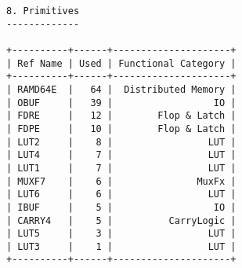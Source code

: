 \begin{verbatim}
8. Primitives
-------------

+----------+------+---------------------+
| Ref Name | Used | Functional Category |
+----------+------+---------------------+
| RAMD64E  |   64 |  Distributed Memory |
| OBUF     |   39 |                  IO |
| FDRE     |   12 |        Flop & Latch |
| FDPE     |   10 |        Flop & Latch |
| LUT2     |    8 |                 LUT |
| LUT4     |    7 |                 LUT |
| LUT1     |    7 |                 LUT |
| MUXF7    |    6 |               MuxFx |
| LUT6     |    6 |                 LUT |
| IBUF     |    5 |                  IO |
| CARRY4   |    5 |          CarryLogic |
| LUT5     |    3 |                 LUT |
| LUT3     |    1 |                 LUT |
+----------+------+---------------------+
\end{verbatim}

